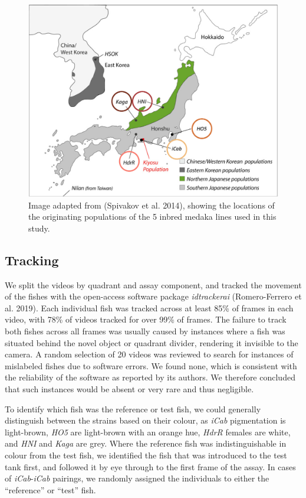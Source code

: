 \documentclass[
]{book}
\begin{document}
\begin{figure}
\includegraphics[width=1\linewidth]{figs/pilot/line_locations} \caption{Image adapted from (Spivakov et al. 2014), showing the locations of the originating populations of the 5 inbred medaka lines used in this study.}\label{fig:line-locations}
\end{figure}

\hypertarget{tracking}{%
\subsection{Tracking}\label{tracking}}

We split the videos by quadrant and assay component, and tracked the movement of the fishes with the open-access software package \emph{idtrackerai} (Romero-Ferrero et al. 2019). Each individual fish was tracked across at least 85\% of frames in each video, with 78\% of videos tracked for over 99\% of frames. The failure to track both fishes across all frames was usually caused by instances where a fish was situated behind the novel object or quadrant divider, rendering it invisible to the camera. A random selection of 20 videos was reviewed to search for instances of mislabeled fishes due to software errors. We found none, which is consistent with the reliability of the software as reported by its authors. We therefore concluded that such instances would be absent or very rare and thus negligible.

To identify which fish was the reference or test fish, we could generally distinguish between the strains based on their colour, as \emph{iCab} pigmentation is light-brown, \emph{HO5} are light-brown with an orange hue, \emph{HdrR} females are white, and \emph{HNI} and \emph{Kaga} are grey. Where the reference fish was indistinguishable in colour from the test fish, we identified the fish that was introduced to the test tank first, and followed it by eye through to the first frame of the assay. In cases of \emph{iCab}-\emph{iCab} pairings, we randomly assigned the individuals to either the ``reference'' or ``test'' fish.
\end{document}
